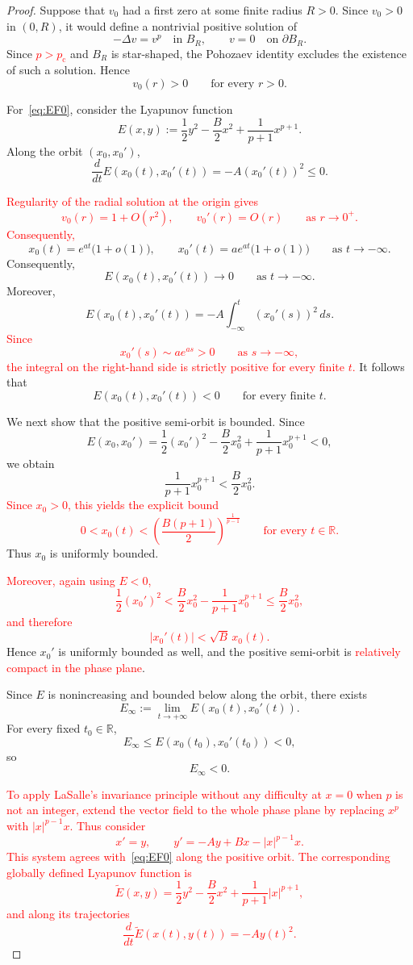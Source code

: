 \documentclass[11pt]{article}
\newcommand{\R}{\mathbb{R}}
\newcommand{\pc}{p_{\mathrm c}}
\theoremstyle{definition}
\begin{document}
\begin{proof}
Suppose that $v_0$ had a first zero at some finite radius $R>0$.
Since $v_0>0$ in $(0,R)$, it would define a nontrivial positive
solution of
\[
-\Delta v=v^p
\quad\text{in }B_R,
\qquad
v=0
\quad\text{on }\partial B_R.
\]
Since \textcolor{red}{$p>\pc$} and $B_R$ is star-shaped, the Pohozaev
identity excludes the existence of such a solution. Hence
\[
v_0(r)>0
\qquad
\text{for every }r>0.
\]

For~\eqref{eq:EF0}, consider the Lyapunov function
\[
E(x,y)
:=
\frac12y^2
-\frac{B}{2}x^2
+\frac1{p+1}x^{p+1}.
\]
Along the orbit $(x_0,x_0')$,
\[
\frac{d}{dt}E(x_0(t),x_0'(t))
=
-A(x_0'(t))^2
\leq0.
\]

\textcolor{red}{Regularity of the radial solution at the origin gives
\[
v_0(r)=1+O(r^2),
\qquad
v_0'(r)=O(r)
\qquad
\text{as }r\to0^+.
\]
Consequently,}
\[
x_0(t)=e^{at}\bigl(1+o(1)\bigr),
\qquad
x_0'(t)=ae^{at}\bigl(1+o(1)\bigr)
\qquad
\text{as }t\to-\infty.
\]
Consequently,
\[
E(x_0(t),x_0'(t))\longrightarrow0
\qquad
\text{as }t\to-\infty.
\]
Moreover,
\[
E(x_0(t),x_0'(t))
=
-A\int_{-\infty}^{t}(x_0'(s))^2\,ds.
\]
\textcolor{red}{Since
\[
x_0'(s)\sim ae^{as}>0
\qquad\text{as }s\to-\infty,
\]
the integral on the right-hand side is strictly positive for every
finite $t$.}
It follows that
\[
E(x_0(t),x_0'(t))<0
\qquad
\text{for every finite }t.
\]

We next show that the positive semi-orbit is bounded. Since
\[
E(x_0,x_0')
=
\frac12(x_0')^2
-\frac{B}{2}x_0^2
+\frac1{p+1}x_0^{p+1}
<0,
\]
we obtain
\[
\frac1{p+1}x_0^{p+1}
<
\frac{B}{2}x_0^2.
\]
\textcolor{red}{Since $x_0>0$, this yields the explicit bound
\[
0<x_0(t)
<
\left(\frac{B(p+1)}{2}\right)^{\frac1{p-1}}
\qquad\text{for every }t\in\mathbb R.
\]}
Thus $x_0$ is uniformly bounded.

\textcolor{red}{Moreover, again using $E<0$,
\[
\frac12(x_0')^2
<
\frac{B}{2}x_0^2
-\frac1{p+1}x_0^{p+1}
\leq
\frac{B}{2}x_0^2,
\]
and therefore
\[
|x_0'(t)|<\sqrt{B}\,x_0(t).
\]}
Hence $x_0'$ is uniformly bounded as well, and the positive
semi-orbit is \textcolor{red}{relatively compact in the phase plane}.

Since $E$ is nonincreasing and bounded below along the orbit, there
exists
\[
E_\infty
:=
\lim_{t\to+\infty}E(x_0(t),x_0'(t)).
\]
For every fixed $t_0\in\R$,
\[
E_\infty\leq E(x_0(t_0),x_0'(t_0))<0,
\]
so
\[
E_\infty<0.
\]

\textcolor{red}{To apply LaSalle's invariance principle without any
difficulty at $x=0$ when $p$ is not an integer, extend the vector
field to the whole phase plane by replacing $x^p$ with
$|x|^{p-1}x$. Thus consider
\[
x'=y,
\qquad
y'=-Ay+Bx-|x|^{p-1}x.
\]
This system agrees with~\eqref{eq:EF0} along the positive orbit.
The corresponding globally defined Lyapunov function is
\[
\widetilde E(x,y)
=
\frac12y^2
-\frac{B}{2}x^2
+\frac1{p+1}|x|^{p+1},
\]
and along its trajectories
\[
\frac{d}{dt}\widetilde E(x(t),y(t))
=
-Ay(t)^2.
\]}


\end{proof}
\end{document}
